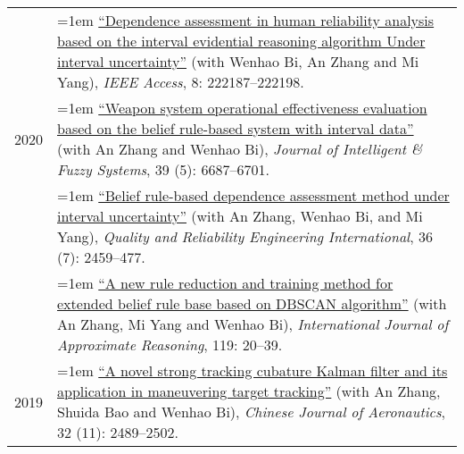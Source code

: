 \documentclass[11pt,english]{article}
\begin{document}
\begin{tabular}{p{.85in}>{\hangindent=1em}p{5.65in}<{\raggedright}}
 &  \href{https://doi.org/10.1109/ACCESS.2020.3043848}{``Dependence assessment in human reliability analysis based on the interval evidential reasoning algorithm Under interval uncertainty''} (with Wenhao Bi, An Zhang and Mi Yang), \textit{IEEE Access}, 8: 222187--222198. \\

2020 &  \href{https://doi.org/10.3233/JIFS-190651}{``Weapon system operational effectiveness evaluation based on the belief rule-based system with interval data''} (with An Zhang and Wenhao Bi), \textit{Journal of Intelligent \& Fuzzy Systems}, 39 (5): 6687--6701. \\
 &  \href{https://doi.org/10.1002/qre.2708}{``Belief rule-based dependence assessment method under interval uncertainty''} (with An Zhang, Wenhao Bi, and Mi Yang), \textit{Quality and Reliability Engineering International}, 36 (7): 2459--477. \\
 
 &  \href{https://doi.org/10.1016/j.ijar.2019.12.016}{``A new rule reduction and training method for extended belief rule base based on DBSCAN algorithm''} (with An Zhang, Mi Yang and Wenhao Bi), \textit{International Journal of Approximate Reasoning}, 119: 20--39. \\

2019 &  \href{https://doi.org/10.1016/j.cja.2019.07.025}{``A novel strong tracking cubature Kalman filter and its application in maneuvering target tracking''} (with An Zhang, Shuida Bao and Wenhao Bi), \textit{Chinese Journal of Aeronautics}, 32 (11): 2489--2502. \\
\end{tabular}
\end{document}
